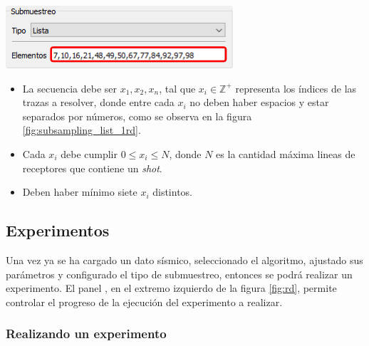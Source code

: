\documentclass[12pt,twoside,letter]{ol-softwaremanual}
\newcommand*\circled[1]{\tikz[baseline=(char.base)]{
            \node[shape=circle,draw,inner sep=2pt] (char) {#1};}}
\newenvironment{Figure}
  {\par\medskip\noindent\minipage{\linewidth}}
  {\endminipage\par\medskip}
\begin{document}
\begin{multicols}{2}
	
	\begin{Figure}
		\vspace{5mm}
		\centering
		\includegraphics[width=1\linewidth]{subsampling-list-1.png}
		\label{fig:subsampling_list_1rd}
	\end{Figure}
	
	\begin{itemize}
		\setlength\itemsep{0em}
		\item La secuencia debe ser $x_1,x_2,x_n$, tal que $x_i \in \mathbb{Z}^+$ representa los índices de las trazas a resolver, donde entre cada $x_i$ no deben haber espacios y estar separados por números, como se observa en la figura \ref{fig:subsampling_list_1rd}.
		\item Cada $x_i$ debe cumplir $0 \leq x_i \leq N$, donde $N$ es la cantidad máxima lineas de receptores que contiene un \emph{shot}.
		\item Deben haber mínimo siete $x_i$ distintos.
	\end{itemize}
	
\end{multicols}

\subsection{Experimentos}
\label{sec:experimentrd}

Una vez ya se ha cargado un dato sísmico, seleccionado el algoritmo, ajustado sus parámetros y configurado el tipo de submuestreo, entonces se podrá realizar un experimento. El panel \circled{4}, en el extremo izquierdo de la figura \ref{fig:rd}, permite controlar el progreso de la ejecución del experimento a realizar.

\subsubsection*{Realizando un experimento}
\end{document}
